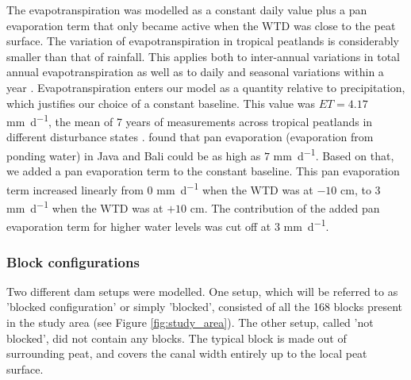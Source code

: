 \documentclass[bg, manuscript]{copernicus}
\begin{document}
The evapotranspiration was modelled as a constant daily value plus a pan evaporation term that only became active when the WTD was close to the peat surface.
The variation of evapotranspiration in tropical peatlands is considerably smaller than that of rainfall.
This applies both to inter-annual variations in total annual evapotranspiration as well as to daily and seasonal variations within a year \citep{hiranoEvapotranspirationTropicalPeat2015, watiComparisonPanEvaporation2018}.
Evapotranspiration enters our model as a quantity relative to precipitation, which justifies our choice of a constant baseline.
This value was $ET = 4.17$ \unit{mm d^{-1}}, the mean of 7 years of measurements across tropical peatlands in different disturbance states \citep{hiranoEvapotranspirationTropicalPeat2015}.
\cite{watiComparisonPanEvaporation2018} found that pan evaporation (evaporation from ponding water) in Java and Bali could be as high as $7$ \unit{mm d^{-1}}.
Based on that, we added a pan evaporation term to the constant baseline.
This pan evaporation term increased linearly from $0$ \unit{mm d^{-1}} when the WTD was at $-10$ \unit{cm}, to $3$  \unit{mm d^{-1}} when the WTD was at $+10$ \unit{cm}.
The contribution of the added pan evaporation term for higher water levels was cut off at $3$ \unit{mm d^{-1}}.


\subsubsection{Block configurations}
Two different dam setups were modelled.
One setup, which will be referred to as  'blocked configuration' or simply 'blocked', consisted of all the 168 blocks present in the study area (see Figure \ref{fig:study_area}).
The other setup, called 'not blocked', did not contain any blocks.
The typical block is made out of surrounding peat, and covers the canal width entirely up to the local peat surface.
\end{document}
